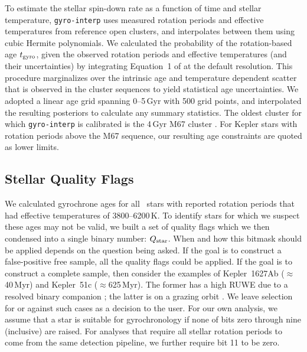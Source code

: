 \documentclass[11pt,twocolumn,tighten]{aastex63}
\begin{document}
To estimate the
stellar spin-down rate as a function of time and stellar temperature,
\texttt{gyro-interp} uses measured rotation periods and effective
temperatures from reference open clusters, and interpolates between them using cubic
Hermite polynomials.  We calculated the probability of the
rotation-based age $t_{\rm gyro}$, given the observed rotation
periods and effective temperatures (and their uncertainties) by
integrating Equation~1 of \citet{Bouma_2023} at the default
resolution.  This procedure marginalizes over the intrinsic age and
temperature dependent scatter that is observed in the cluster
sequences to yield statistical age uncertainties.
We adopted a linear age grid spanning 0--5\,Gyr with
500 grid points, and interpolated the resulting posteriors to calculate
any summary statistics.
The oldest cluster for which
\texttt{gyro-interp} is calibrated 
is the 4\,Gyr M67 cluster
\citep[][]{Dungee_2022,Gruner_2023}.  
For Kepler stars with rotation periods above the 
M67 sequence, our resulting age constraints are quoted as lower limits.



\subsection{Stellar Quality Flags}
\label{subsec:flags}
We calculated gyrochrone ages for all \nuniqstarsantosrotteffcut\
stars with reported rotation periods that had effective temperatures of
3800--6200\,K.  To identify stars for which we suspect these ages may not
be valid, we built a set of quality flags which we then condensed
into a single binary number: $Q_{\rm star}$.  When and how
this bitmask should be applied depends on the question being
asked.  If the goal is to construct a false-positive free sample, all the
quality flags could be applied.  If the goal is to construct a complete sample,
then consider the examples of Kepler~1627Ab ($\approx$40\,Myr) and
Kepler~51c ($\approx$625\,Myr).  The former has a high RUWE due to a
resolved binary companion \citep{Bouma_2022a}; the latter is on a
grazing orbit \citep{2014ApJ...783...53M}.  We leave selection for or
against such cases as a decision to the user.
For our own analysis, 
we assume that a star
is suitable for gyrochronology if none of bits zero through nine
(inclusive) are raised.  For analyses that require all
stellar rotation periods to come from the same detection pipeline, we
further require bit 11 to be zero. 
\end{document}
